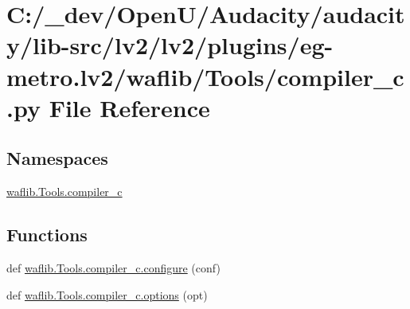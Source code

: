 \hypertarget{lv2_2plugins_2eg-metro_8lv2_2waflib_2_tools_2compiler__c_8py}{}\section{C\+:/\+\_\+dev/\+Open\+U/\+Audacity/audacity/lib-\/src/lv2/lv2/plugins/eg-\/metro.lv2/waflib/\+Tools/compiler\+\_\+c.py File Reference}
\label{lv2_2plugins_2eg-metro_8lv2_2waflib_2_tools_2compiler__c_8py}
\subsection*{Namespaces}
\begin{DoxyCompactItemize}
\item 
 \hyperlink{namespacewaflib_1_1_tools_1_1compiler__c}{waflib.\+Tools.\+compiler\+\_\+c}
\end{DoxyCompactItemize}
\subsection*{Functions}
\begin{DoxyCompactItemize}
\item 
def \hyperlink{namespacewaflib_1_1_tools_1_1compiler__c_a21492d9277532807d6c9af80d07ab9cd}{waflib.\+Tools.\+compiler\+\_\+c.\+configure} (conf)
\item 
def \hyperlink{namespacewaflib_1_1_tools_1_1compiler__c_a3700f55375e0ba3c634ddfe42b019667}{waflib.\+Tools.\+compiler\+\_\+c.\+options} (opt)
\end{DoxyCompactItemize}
